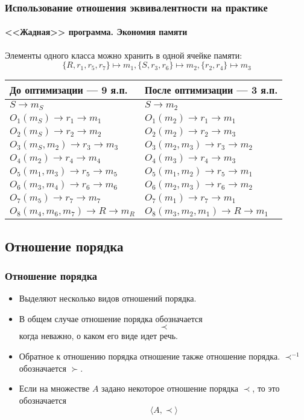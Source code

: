 \begin{frame}
    \frametitle{Использование отношения эквивалентности на практике}
    \framesubtitle{<<Жадная>> программа. Экономия памяти}

    Элементы одного класса можно хранить в одной ячейке памяти:
    \[
        \{R,r_1,r_5,r_7\}\mapsto m_1, \{S,r_3,r_6\}\mapsto m_2, \{r_2,r_4\}\mapsto m_3
    \]
    \begin{center}
        \begin{tabular}{l|l}
            \hline\hline
            До оптимизации --- 9 я.п.      & После оптимизации --- 3 я.п.   \\
            \hline\hline
            $S \to m_S$                    &  $S\to m_2$                    \\ \hline
            $O_1(m_S)\to r_1 \to m_1$      &  $O_1(m_2)\to r_1 \to m_1$     \\
            $O_2(m_S)\to r_2 \to m_2$      &  $O_2(m_2)\to r_2 \to m_3$     \\ \hline
            $O_3(m_S,m_2)\to r_3 \to m_3$  &  $O_3(m_2,m_3)\to r_3 \to m_2$ \\
            $O_4(m_2)\to r_4 \to m_4$      &  $O_4(m_3)\to r_4 \to m_3$     \\ \hline
            $O_5(m_1,m_3)\to r_5 \to m_5$  &  $O_5(m_1,m_2)\to r_5 \to m_1$ \\
            $O_6(m_3,m_4)\to r_6 \to m_6$  &  $O_6(m_2,m_3)\to r_6 \to m_2$ \\ \hline
            $O_7(m_5)\to r_7 \to m_7$      &  $O_7(m_1)\to r_7 \to m_1$     \\ \hline
            $O_8(m_4,m_6,m_7)\to R \to m_R$&  $O_8(m_3,m_2,m_1)\to R\to m_1$\\ \hline
        \end{tabular}
    \end{center}
\end{frame}    


\subsection{Отношение порядка}

\begin{frame}
    \frametitle{Отношение порядка}
    
    \begin{itemize}
        \item Выделяют несколько видов отношений порядка. 
    
        \item В общем случае отношение порядка обозначается \[\prec\] когда неважно, о каком его виде идет речь. 
    
        \item Обратное к отношению порядка отношение также отношение порядка. $\prec^{-1}$ обозначается $\succ$.
        
        \item Если на множестве $A$ задано некоторое отношение порядка $\prec$, то это обозначается
        \[
            \langle A,\prec\rangle
        \]
    \end{itemize}
\end{frame}


